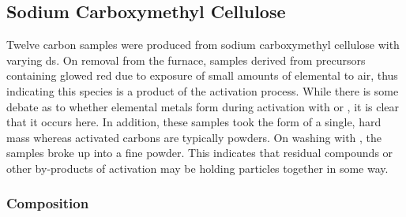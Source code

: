 \newpage
\subsection{Sodium Carboxymethyl Cellulose}
\label{ss:NC}

Twelve carbon samples were produced from sodium carboxymethyl cellulose with varying \acrshort{ds}. On removal from the furnace, samples derived from precursors containing  glowed red due to exposure of small amounts of elemental  to air, thus indicating this species is a product of the activation process. While there is some debate as to whether elemental metals form during activation with  or ,\citep{Blankenship2022Modulating, Sevilla2014Energy, LozanoCastello2007Carbon, Kelemen1983interaction, Xue2003Formation} it is clear that it occurs here. In addition, these samples took the form of a single, hard mass whereas activated carbons are typically powders. On washing with , the samples broke up into a fine powder. This indicates that residual  compounds or other by-products of activation may be holding particles together in some way.

\subsubsection{Composition}
\label{sss:NC_composition}

